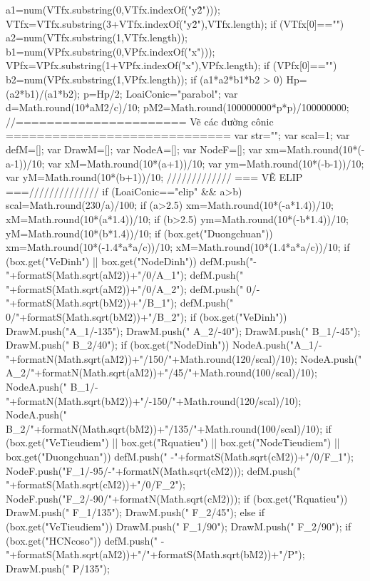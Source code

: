 {{{			a1=num(VTfx.substring(0,VTfx.indexOf("y\^2")));
			VTfx=VTfx.substring(3+VTfx.indexOf("y\^2"),VTfx.length);
			if (VTfx[0]=="\/")
			a2=num(VTfx.substring(1,VTfx.length));
			b1=num(VPfx.substring(0,VPfx.indexOf("x")));
			VPfx=VPfx.substring(1+VPfx.indexOf("x"),VPfx.length);
			if (VPfx[0]=="\/")
			b2=num(VPfx.substring(1,VPfx.length));
			if (a1*a2*b1*b2 > 0) {
				Hp=(a2*b1)/(a1*b2);	p=Hp/2;
				LoaiConic="parabol";
			}
		}
		var d=Math.round(10*aM2/c)/10;
		pM2=Math.round(100000000*p*p)/100000000;
		//====================== Vẽ các đường cônic =============================
		var str=""; var scal=1; var defM=[]; var DrawM=[]; var NodeA=[]; var NodeF=[];
		var xm=Math.round(10*(-a-1))/10;	var xM=Math.round(10*(a+1))/10;
		var ym=Math.round(10*(-b-1))/10;	var yM=Math.round(10*(b+1))/10;
		///////////// === VẼ ELIP ===//////////////
		if (LoaiConic=="elip" && a>b) {
			scal=Math.round(230/a)/100;
			if (a>2.5) {
				xm=Math.round(10*(-a*1.4))/10;	xM=Math.round(10*(a*1.4))/10;
			}
			if (b>2.5) {
				ym=Math.round(10*(-b*1.4))/10;	yM=Math.round(10*(b*1.4))/10;
			}
			if (box.get("Duongchuan")) {
				xm=Math.round(10*(-1.4*a*a/c))/10;	xM=Math.round(10*(1.4*a*a/c))/10;
			}
			if (box.get("VeDinh") || box.get("NodeDinh")) {
				defM.push("{-"+formatS(Math.sqrt(aM2))+"}/0/A_1");		defM.push(" {"+formatS(Math.sqrt(aM2))+"}/0/A_2");
				defM.push(" 0/{-"+formatS(Math.sqrt(bM2))+"}/B_1");		defM.push(" 0/{"+formatS(Math.sqrt(bM2))+"}/B_2");
				if (box.get("VeDinh")) {
					DrawM.push("A_1/-135");		DrawM.push(" A_2/-40");
					DrawM.push(" B_1/-45");		DrawM.push(" B_2/40");
				}
				if (box.get("NodeDinh")) {
					NodeA.push("A_1/-"+formatN(Math.sqrt(aM2))+"/150/"+Math.round(120/scal)/10);		NodeA.push(" A_2/"+formatN(Math.sqrt(aM2))+"/45/"+Math.round(100/scal)/10);
					NodeA.push(" B_1/-"+formatN(Math.sqrt(bM2))+"/-150/"+Math.round(120/scal)/10);	NodeA.push(" B_2/"+formatN(Math.sqrt(bM2))+"/135/"+Math.round(100/scal)/10);
				}
			}
			if (box.get("VeTieudiem") || box.get("Rquatieu") || box.get("NodeTieudiem") || box.get("Duongchuan")) {
				defM.push(" {-"+formatS(Math.sqrt(cM2))+"}/0/F_1");		NodeF.push("F_1/-95/-"+formatN(Math.sqrt(cM2)));
				defM.push(" {"+formatS(Math.sqrt(cM2))+"}/0/F_2");		NodeF.push("F_2/-90/"+formatN(Math.sqrt(cM2)));
				if (box.get("Rquatieu")) {
					DrawM.push(" F_1/135");	DrawM.push(" F_2/45");
				}
				else if (box.get("VeTieudiem")){
					DrawM.push(" F_1/90");	DrawM.push(" F_2/90");	
				}
			}
			if (box.get("HCNcoso")) {
				defM.push(" {-"+formatS(Math.sqrt(aM2))+"}/{"+formatS(Math.sqrt(bM2))+"}/P");	DrawM.push(" P/135");
}}}}

